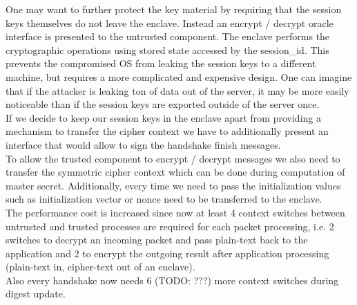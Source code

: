 \documentclass[../main.tex]{subfiles}
\begin{document}
One may want to further protect the key material by requiring that the
session keys themselves do not leave the enclave. Instead an encrypt /
decrypt oracle interface is presented to the untrusted component. The
enclave performs the cryptographic operations using stored state
accessed by the session\_id. This prevents the compromised OS from
leaking the session keys to a different machine, but requires a more
complicated and expensive design. One can imagine that if the attacker
is leaking ton of data out of the server, it may be more easily
noticeable than if the session keys are exported outside of the server
once.\\

\noindent
If we decide to keep our session keys in the enclave apart from
providing a mechanism to transfer the cipher context we have to
additionally present an interface that would allow to sign the
handshake finish messages.\\

\noindent
To allow the trusted component to encrypt / decrypt messages we also
need to transfer the symmetric cipher context which can be done during
computation of master secret. Additionally, every time we need to pass
the initialization values such as initialization vector or nonce need
to be transferred to the enclave.\\

\noindent
The performance cost is increased since now at least 4 context
switches between untrusted and trusted processes are required for each
packet processing, i.e. 2 switches to decrypt an incoming packet and
pass plain-text back to the application and 2 to encrypt the outgoing
result after application processing (plain-text in, cipher-text out of
an enclave).\\

\noindent
Also every handshake now needs 6 (TODO: ???) more context switches
during digest update.


\end{document}
